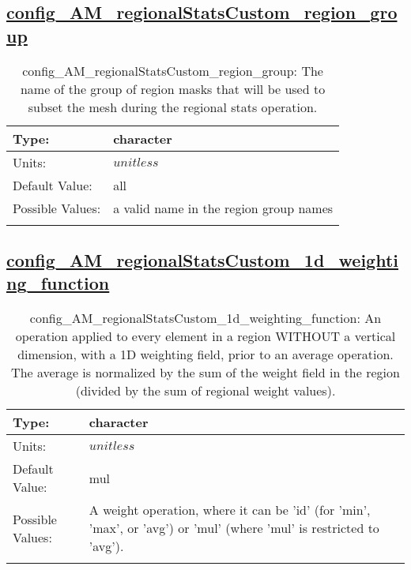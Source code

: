 \subsection[config\_AM\_regionalStatsCustom\_region\_group]{\hyperref[sec:nm_tab_AM_regionalStatsCustom]{config\_AM\_regionalStatsCustom\_region\_group}}
\label{subsec:nm_sec_config_AM_regionalStatsCustom_region_group}
\begin{center}
\begin{longtable}{| p{2.0in} || p{4.0in} |}
    \hline
    Type: & character \\
    \hline
    Units: & $unitless$ \\
    \hline
    Default Value: & all \\
    \hline
    Possible Values: & a valid name in the region group names \\
    \hline
    \caption{config\_AM\_regionalStatsCustom\_region\_group: The name of the group of region masks that will be used to subset the mesh during the regional stats operation.}
\end{longtable}
\end{center}
\subsection[config\_AM\_regionalStatsCustom\_1d\_weighting\_function]{\hyperref[sec:nm_tab_AM_regionalStatsCustom]{config\_AM\_regionalStatsCustom\_1d\_weighting\_function}}
\label{subsec:nm_sec_config_AM_regionalStatsCustom_1d_weighting_function}
\begin{center}
\begin{longtable}{| p{2.0in} || p{4.0in} |}
    \hline
    Type: & character \\
    \hline
    Units: & $unitless$ \\
    \hline
    Default Value: & mul \\
    \hline
    Possible Values: & A weight operation, where it can be 'id' (for 'min', 'max', or 'avg') or 'mul' (where 'mul' is restricted to 'avg'). \\
    \hline
    \caption{config\_AM\_regionalStatsCustom\_1d\_weighting\_function: An operation applied to every element in a region WITHOUT a vertical dimension, with a 1D weighting field, prior to an average operation. The average is normalized by the sum of the weight field in the region (divided by the sum of regional weight values).}
\end{longtable}
\end{center}
